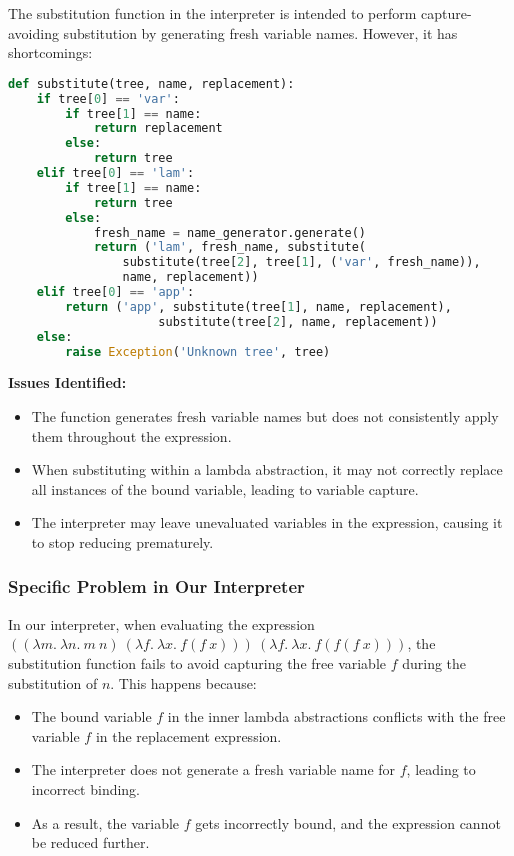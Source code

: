 \documentclass{article}
\begin{document}
The substitution function in the interpreter is intended to perform capture-avoiding substitution by generating fresh variable names. However, it has shortcomings:

\begin{lstlisting}[language=Python]
def substitute(tree, name, replacement):
    if tree[0] == 'var':
        if tree[1] == name:
            return replacement
        else:
            return tree
    elif tree[0] == 'lam':
        if tree[1] == name:
            return tree
        else:
            fresh_name = name_generator.generate()
            return ('lam', fresh_name, substitute(
                substitute(tree[2], tree[1], ('var', fresh_name)),
                name, replacement))
    elif tree[0] == 'app':
        return ('app', substitute(tree[1], name, replacement),
                     substitute(tree[2], name, replacement))
    else:
        raise Exception('Unknown tree', tree)
\end{lstlisting}

\textbf{Issues Identified:}

\begin{itemize}
    \item The function generates fresh variable names but does not consistently apply them throughout the expression.
    \item When substituting within a lambda abstraction, it may not correctly replace all instances of the bound variable, leading to variable capture.
    \item The interpreter may leave unevaluated variables in the expression, causing it to stop reducing prematurely.
\end{itemize}

\subsubsection*{Specific Problem in Our Interpreter}

In our interpreter, when evaluating the expression \(\left((\lambda m.\ \lambda n.\ m\ n)\ (\lambda f.\ \lambda x.\ f(f\ x))\right)\ (\lambda f.\ \lambda x.\ f(f(f\ x)))\), the substitution function fails to avoid capturing the free variable \(f\) during the substitution of \(n\). This happens because:

\begin{itemize}
    \item The bound variable \(f\) in the inner lambda abstractions conflicts with the free variable \(f\) in the replacement expression.
    \item The interpreter does not generate a fresh variable name for \(f\), leading to incorrect binding.
    \item As a result, the variable \(f\) gets incorrectly bound, and the expression cannot be reduced further.
\end{itemize}
\end{document}
